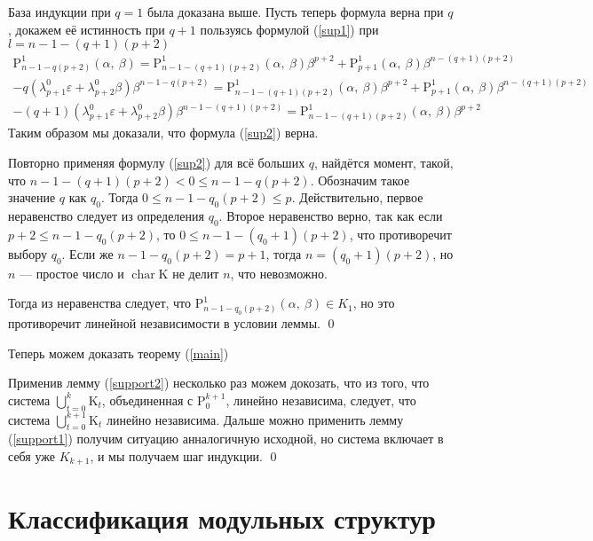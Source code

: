 \documentclass[12pt, reqno, a4paper, oneside, notitlepage]{amsart}
\makeatletter
\theoremstyle{mytheoremstyle}
\theoremstyle{myremarkstyle}
\numberwithin{equation}{section}
\renewenvironment{proof}[1][\proofname]{\par\indent {\bfseries #1\@addpunct{.} }}{\qed}
\DeclareMathOperator{\chr}{char}
\makeatother
\begin{document}
\begin{proof}
  База индукции при $q = 1$ была доказана выше.
  Пусть теперь формула верна при $q$, докажем её истинность при $q+1$ пользуясь формулой (\ref{sup1}) при $l = n-1-(q+1)(p+2)$
  \begin{eqnarray*}
  \mathrm{P}^1_{n-1-q(p+2)}(\alpha,\ \beta) = \mathrm{P}^1_{n-1-(q+1)(p+2)}(\alpha,\ \beta)\beta^{p+2} + \mathrm{P}^1_{p+1}(\alpha,\ \beta)\beta^{n-(q+1)(p+2)}\\
	-q(\lambda^0_{p+1}\varepsilon+ \lambda^0_{p+2}\beta)\beta^{n-1-q(p+2)} = \mathrm{P}^1_{n-1-(q+1)(p+2)}(\alpha,\ \beta)\beta^{p+2} + \mathrm{P}^1_{p+1}(\alpha,\ \beta)\beta^{n-(q+1)(p+2)}\\
	-(q+1)(\lambda^0_{p+1}\varepsilon+ \lambda^0_{p+2}\beta)\beta^{n-1-(q+1)(p+2)} = \mathrm{P}^1_{n-1-(q+1)(p+2)}(\alpha,\ \beta)\beta^{p+2}
  \end{eqnarray*}
  Таким образом мы доказали, что формула (\ref{sup2}) верна.

  Повторно применяя формулу (\ref{sup2}) для всё больших $q$, найдётся момент, такой, что $n-1-(q+1)(p+2) < 0 \leq n-1-q(p+2)$. Обозначим такое значение $q$ как $q_0$.
  Тогда $0 \leq n-1-q_0(p+2) \leq p$. Действительно, первое неравенство следует из определения $q_0$.
  Второе неравенство верно, так как если $p+2 \leq n-1-q_0(p+2)$, то $0 \leq n-1-(q_0+1)(p+2)$, что противоречит выбору $q_0$. Если же $n-1-q_0(p+2) = p+1$, тогда $n = (q_0+1)(p+2)$, но $n$ --- простое число и $\chr \mathrm{K}$ не делит $n$, что невозможно.

  Тогда из неравенства следует, что $\mathrm{P}^1_{n-1-q_0(p+2)}(\alpha,\ \beta) \in K_1$, но это противоречит линейной независимости в условии леммы.
\end{proof}

Теперь можем доказать теорему (\ref{main})

\begin{proof}[Доказательство теоремы \ref{main}]
  Применив лемму (\ref{support2}) несколько раз можем докозать, что из того, что система $\bigcup\limits_{t = 0}^k\mathrm{K}_t$, объединенная с $\mathrm{P}^{k+1}_0$, линейно независима, следует, что система $\bigcup\limits_{t = 0}^{k+1}\mathrm{K}_t$ линейно независима. Дальше можно применить лемму (\ref{support1}) получим ситуацию анналогичную исходной, но система включает в себя уже $K_{k+1}$, и мы получаем шаг индукции.
\end{proof}

\newpage
\section{Классификация модульных структур}
\end{document}
